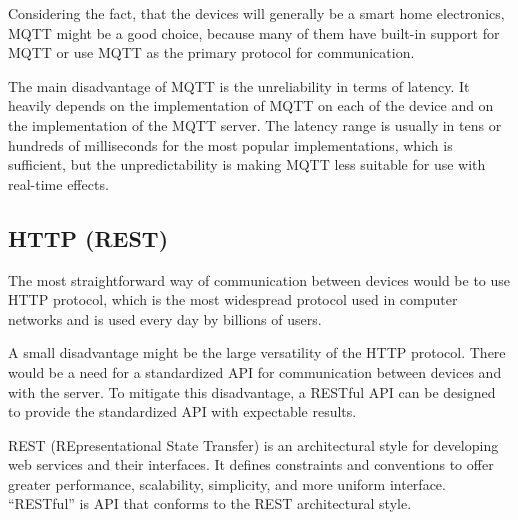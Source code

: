 Considering the fact, that the devices will generally be a smart home
electronics, MQTT might be a good choice, because many of them have built-in
support for MQTT or use MQTT as the primary protocol for communication.


The main disadvantage of MQTT is the unreliability in terms of latency.
It heavily depends on the implementation of MQTT on each of the device and on
the implementation of the MQTT server. The latency range is usually
in tens or hundreds of milliseconds for the most popular implementations,
\cite{mqttlat} which is sufficient, but the unpredictability is making MQTT
less suitable for use with real-time effects.

\pagebreak

\subsection{HTTP (REST)}
The most straightforward way of communication between devices would be to use
HTTP protocol, which is the most widespread protocol used in computer networks
and is used every day by billions of users. \cite{httpsrv}


A small disadvantage might be the large versatility of the HTTP protocol. There would be
a need for a standardized API for communication between devices and with the
server. To mitigate this disadvantage, a RESTful API can be designed to provide
the standardized API with expectable results.


REST (REpresentational State Transfer) is an architectural style for developing
web services and their interfaces. It defines constraints and conventions to
offer greater performance, scalability, simplicity, and more uniform interface.
\cite{restdef} ``RESTful'' is API that conforms to the REST architectural style.